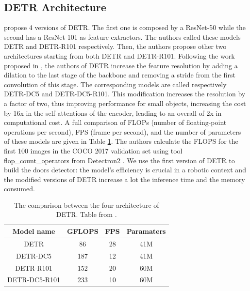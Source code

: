 \subsection{DETR Architecture}
\citeauthor{detr} \cite{detr} propose 4 versions of DETR. The first one is composed by a ResNet-50 while the second has a ResNet-101 as feature extractors. The authors called these models DETR and DETR-R101 respectively. Then, the authors propose other two architectures starting from both DETR and DETR-R101. Following the work proposed in \cite{fullyconvolutional}, the authors of DETR increase the feature resolution by
adding a dilation to the last stage of the backbone and removing a stride from
the first convolution of this stage. The corresponding models are called respectively DETR-DC5 and DETR-DC5-R101. This modification
increases the resolution by a factor of two, thus improving performance for small
objects, increasing the cost by 16x in the self-attentions of the encoder,
leading to an overall of 2x in computational cost. A full comparison of
FLOPs (number of floating-point operations per second), FPS (frame per second), and the number of parameters of these models are given in Table \ref{tab:detr_models_flops}. The authors calculate the FLOPS for the first 100 images in the COCO 2017 validation set using tool \textsf{flop\_count\_operators} from Detectron2 \cite{detectron2}. We use the first version of DETR to build the doors detector: the model's efficiency is crucial in a robotic context and the modified versions of DETR increase a lot the inference time and the memory consumed. 

\begin{table}[h!]
	\centering
	\begin{tabular}{cccc}
		
		\toprule
		\textbf{Model name} & \textbf{GFLOPS} & \textbf{FPS} & \textbf{Paramaters} \tabularnewline
		\midrule
		DETR & 86 & 28 & 41M\tabularnewline
		DETR-DC5 & 187 & 12 & 41M\tabularnewline
		DETR-R101 & 152 & 20 & 60M\tabularnewline
		DETR-DC5-R101 & 233 & 10 & 60M\tabularnewline
		\bottomrule
	\end{tabular}
	\caption{The comparison between the four architecture of DETR. Table from \cite{detr}.}
	\label{tab:detr_models_flops}
\end{table}

